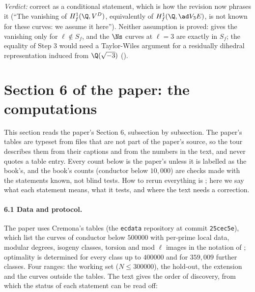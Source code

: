 \begin{sloppypar}
\noindent\emph{Verdict:} correct as a conditional statement, which is how the revision now phrases it (``The vanishing of $H^1_f(\Q,V^D)$, equivalently of $H^1_f(\Q,\ad V_3E)$, is not known
for these curves: we assume it here''). Neither assumption is proved: \cite[Theorem 2.7]{DFG04} gives the vanishing only for $\ell\notin S_f$, and the $\Ns$ curves at $\ell=3$ are exactly in
$S_f$; the equality of Step 3 would need a Taylor-Wiles argument for a residually dihedral representation induced from $\Q(\sqrt{-3})$ ().

\section[Paper 6: the computations]{Section 6 of the paper: the computations}\label{sec:paper:data}

This section reads the paper's Section 6, subsection by subsection. The paper's tables are typeset from files that are not part of the paper's source,
so the tour describes them from their captions and from the numbers in the text, and never quotes a table entry. Every count below is the paper's unless it
is labelled as the book's, and the book's counts (conductor below $10{,}000$) are checks made with the statements known, not blind tests. How to rerun
everything is ; here we say what each statement means, what it tests, and where the text needs a correction.

\paragraph{6.1 Data and protocol.} The paper uses Cremona's tables \cite{Cremona97} (the \texttt{ecdata} repository at commit \texttt{25cec5e}), which list the curves of conductor
below $500000$ with per-prime local data, modular degrees, isogeny classes, torsion and mod $\ell$ images in the notation of \cite{Sutherland16}; optimality is determined for
every class up to $400000$ and for $359{,}009$ further classes. Four ranges: the working set ($N\le300000$), the hold-out, the extension and the curves outside the tables. The text
gives the order of discovery, from which the status of each statement can be read off:


\end{sloppypar}
